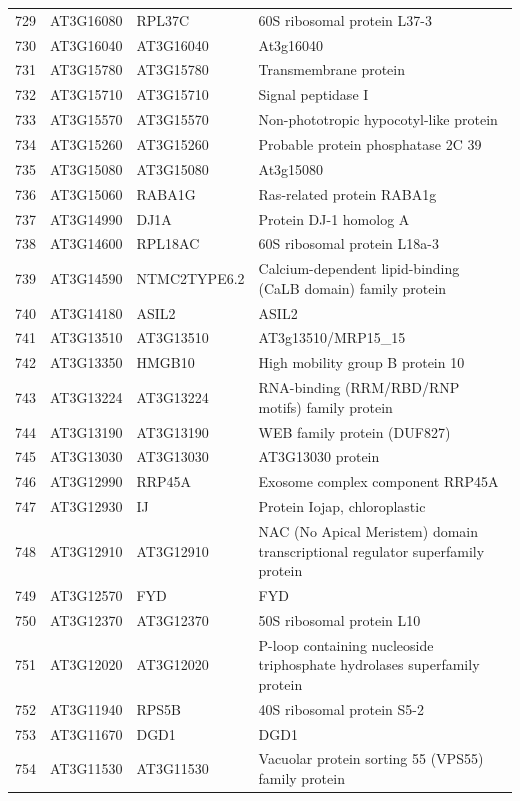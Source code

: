 \documentclass[11pt]{article}
\begin{document}
\begin{center}
\begin{tabular}{rlll}
729 & AT3G16080 & RPL37C & 60S ribosomal protein L37-3\\
730 & AT3G16040 & AT3G16040 & At3g16040\\
731 & AT3G15780 & AT3G15780 & Transmembrane protein\\
732 & AT3G15710 & AT3G15710 & Signal peptidase I\\
733 & AT3G15570 & AT3G15570 & Non-phototropic hypocotyl-like protein\\
734 & AT3G15260 & AT3G15260 & Probable protein phosphatase 2C 39\\
735 & AT3G15080 & AT3G15080 & At3g15080\\
736 & AT3G15060 & RABA1G & Ras-related protein RABA1g\\
737 & AT3G14990 & DJ1A & Protein DJ-1 homolog A\\
738 & AT3G14600 & RPL18AC & 60S ribosomal protein L18a-3\\
739 & AT3G14590 & NTMC2TYPE6.2 & Calcium-dependent lipid-binding (CaLB domain) family protein\\
740 & AT3G14180 & ASIL2 & ASIL2\\
741 & AT3G13510 & AT3G13510 & AT3g13510/MRP15\_15\\
742 & AT3G13350 & HMGB10 & High mobility group B protein 10\\
743 & AT3G13224 & AT3G13224 & RNA-binding (RRM/RBD/RNP motifs) family protein\\
744 & AT3G13190 & AT3G13190 & WEB family protein (DUF827)\\
745 & AT3G13030 & AT3G13030 & AT3G13030 protein\\
746 & AT3G12990 & RRP45A & Exosome complex component RRP45A\\
747 & AT3G12930 & IJ & Protein Iojap, chloroplastic\\
748 & AT3G12910 & AT3G12910 & NAC (No Apical Meristem) domain transcriptional regulator superfamily protein\\
749 & AT3G12570 & FYD & FYD\\
750 & AT3G12370 & AT3G12370 & 50S ribosomal protein L10\\
751 & AT3G12020 & AT3G12020 & P-loop containing nucleoside triphosphate hydrolases superfamily protein\\
752 & AT3G11940 & RPS5B & 40S ribosomal protein S5-2\\
753 & AT3G11670 & DGD1 & DGD1\\
754 & AT3G11530 & AT3G11530 & Vacuolar protein sorting 55 (VPS55) family protein\\

\end{tabular}
\end{center}
\end{document}
